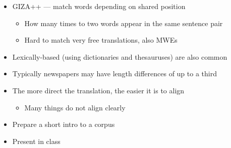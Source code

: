 \documentclass[a4paper,landscape,headrule,footrule,xetex]{foils}
\begin{document}
\begin{itemize}
\item GIZA++ --- match words depending on shared position
  \begin{itemize}
  \item How many times to two words appear in the same sentence pair
  \item Hard to match very free translations, also MWEs
  \end{itemize}
\item Lexically-based (using dictionaries and thesauruses) are also common
\item Typically newspapers may have length differences of up to a third
\item The more direct the translation, the easier it is to align 
  \begin{itemize}
  \item Many things do not align clearly
  \end{itemize}
\end{itemize}


\begin{itemize}
\item Prepare a short intro to a corpus
\item Present in class
\end{itemize}






\end{document}
